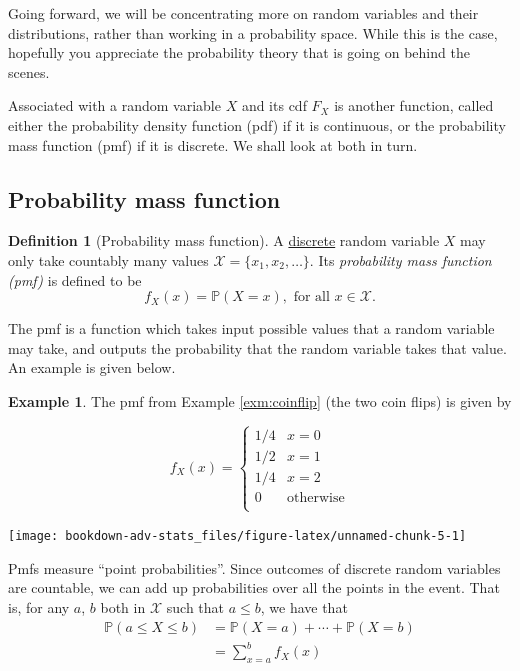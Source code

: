 \documentclass[
]{book}
\newcommand{\bbP}{\mathbb{P}}
\newcommand{\cX}{{\mathcal X}}
\theoremstyle{definition}
\newtheorem{definition}{Definition}[chapter]
\theoremstyle{definition}
\newtheorem{example}{Example}[chapter]
\theoremstyle{definition}
\theoremstyle{definition}
\theoremstyle{remark}
\begin{document}
Going forward, we will be concentrating more on random variables and their distributions, rather than working in a probability space.
While this is the case, hopefully you appreciate the probability theory that is going on behind the scenes.

Associated with a random variable \(X\) and its cdf \(F_X\) is another function, called either the probability density function (pdf) if it is continuous, or the probability mass function (pmf) if it is discrete.
We shall look at both in turn.

\hypertarget{probability-mass-function}{%
\subsection{Probability mass function}\label{probability-mass-function}}

\begin{definition}[Probability mass function]
A \uline{discrete} random variable \(X\) may only take countably many values \(\cX = \{x_1, x_2,\dots \}\).
Its \emph{probability mass function (pmf)} is defined to be
\[
f_X(x) = \bbP(X=x), \text{ for all } x \in \cX.
\]
\end{definition}

The pmf is a function which takes input possible values that a random variable may take, and outputs the probability that the random variable takes that value.
An example is given below.

\begin{example}

The pmf from Example \ref{exm:coinflip} (the two coin flips) is given by

\[
f_X(x) = \begin{cases}
1/4&x=0 \\
1/2&x=1 \\
1/4& x=2\\
0 &\text{otherwise}\\
\end{cases}
\]

\begin{center}\texttt{[image: bookdown-adv-stats\_files/figure-latex/unnamed-chunk-5-1]} \end{center}

\end{example}

Pmfs measure ``point probabilities''. Since outcomes of discrete random variables are countable, we can add up probabilities over all the points in the event.
That is, for any \(a\), \(b\) both in \(\cX\) such that \(a \leq b\), we have that
\begin{align*}
\bbP(a \leq X \leq b) 
&= \bbP(X=a) + \cdots + \bbP(X=b) \\
&= \sum_{x=a}^b f_X(x) 
\end{align*}
\end{document}
